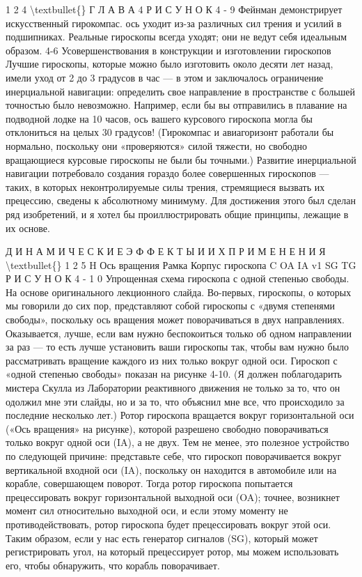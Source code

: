 \documentclass[10pt,oneside]{article}
\begin{document}
1 2 4 \textbackslash{}textbullet\{\} Г Л А В А  4 Р И С У Н О К  4 - 9 Фейнман демонстрирует искусственный гирокомпас. ось уходит из-за различных сил трения и усилий в подшипниках. Реальные гироскопы всегда уходят; они не ведут себя идеальным образом. 4-6 Усовершенствования в конструкции и изготовлении гироскопов Лучшие гироскопы, которые можно было изготовить около десяти лет назад, имели уход от 2 до 3 градусов в час --- в этом и заключалось ограничение инерциальной навигации: определить свое направление в пространстве с большей точностью было невозможно. Например, если бы вы отправились в плавание на подводной лодке на 10 часов, ось вашего курсового гироскопа могла бы отклониться на целых 30 градусов! (Гирокомпас и авиагоризонт работали бы нормально, поскольку они «проверяются» силой тяжести, но свободно вращающиеся курсовые гироскопы не были бы точными.) Развитие инерциальной навигации потребовало создания гораздо более совершенных гироскопов --- таких, в которых неконтролируемые силы трения, стремящиеся вызвать их прецессию, сведены к абсолютному минимуму. Для достижения этого был сделан ряд изобретений, и я хотел бы проиллюстрировать общие принципы, лежащие в их основе.\par

Д И Н А М И Ч Е С К И Е  Э Ф Ф Е К Т Ы  И  И Х  П Р И М Е Н Е Н И Я \textbackslash{}textbullet\{\} 1 2 5 H Ось вращения Рамка Корпус гироскопа C OA IA v1 SG TG Р И С У Н О К  4 - 1 0 Упрощенная схема гироскопа с одной степенью свободы. На основе оригинального лекционного слайда. Во-первых, гироскопы, о которых мы говорили до сих пор, представляют собой гироскопы с «двумя степенями свободы», поскольку ось вращения может поворачиваться в двух направлениях. Оказывается, лучше, если вам нужно беспокоиться только об одном направлении за раз --- то есть лучше установить ваши гироскопы так, чтобы вам нужно было рассматривать вращение каждого из них только вокруг одной оси. Гироскоп с «одной степенью свободы» показан на рисунке 4-10. (Я должен поблагодарить мистера Скулла из Лаборатории реактивного движения не только за то, что он одолжил мне эти слайды, но и за то, что объяснил мне все, что происходило за последние несколько лет.) Ротор гироскопа вращается вокруг горизонтальной оси («Ось вращения» на рисунке), которой разрешено свободно поворачиваться только вокруг одной оси (IA), а не двух. Тем не менее, это полезное устройство по следующей причине: представьте себе, что гироскоп поворачивается вокруг вертикальной входной оси (IA), поскольку он находится в автомобиле или на корабле, совершающем поворот. Тогда ротор гироскопа попытается прецессировать вокруг горизонтальной выходной оси (OA); точнее, возникнет момент сил относительно выходной оси, и если этому моменту не противодействовать, ротор гироскопа будет прецессировать вокруг этой оси. Таким образом, если у нас есть генератор сигналов (SG), который может регистрировать угол, на который прецессирует ротор, мы можем использовать его, чтобы обнаружить, что корабль поворачивает.\par
\end{document}
